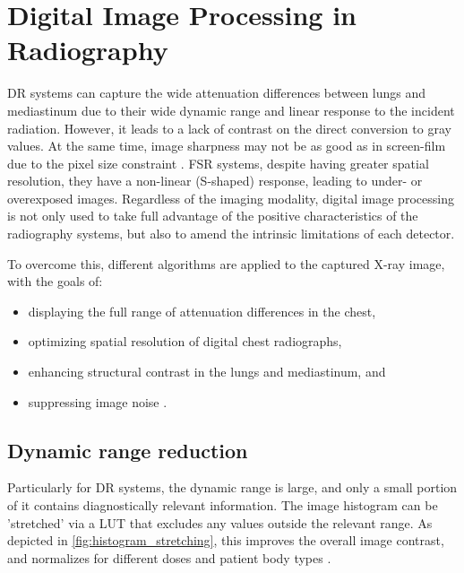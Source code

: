 \documentclass[nomenclature, english, bibtex]{kththesis}
\numberwithin{listing}{chapter}
\begin{document}
\section{Digital Image Processing in Radiography}
\label{sec:DigitalImageProcessing}


\acrfull{DR} systems can capture the wide attenuation differences between lungs and mediastinum due to
their wide dynamic range and linear response to the incident radiation. However, it leads to a lack of contrast on
the direct conversion to gray values. At the same time, image sharpness may not be as good as in screen-film
due to the pixel size constraint \cite[p.~148]{Prokop2003}. \acrfull{FSR} systems, despite having greater spatial
resolution, they have a non-linear (S-shaped) response, leading to under- or overexposed images\cite[p.~551]{vuylstekeMultiscaleImageContrast1994}.
Regardless of the imaging modality, digital image processing is not only used to take full advantage of the positive
characteristics of the radiography systems, but also to amend the intrinsic limitations of each detector.

To overcome this, different algorithms are applied to the captured X-ray image, with the goals of:

\begin{itemize}
    \item displaying the full range of attenuation differences in the chest,
    \item optimizing spatial resolution of digital chest radiographs,
    \item enhancing structural contrast in the lungs and mediastinum, and
    \item suppressing image noise \cite[p.~149]{Prokop2003}.
\end{itemize}


\subsection{Dynamic range reduction}

Particularly for \acrshort{DR} systems, the dynamic range is large, and only a small portion of it contains diagnostically
relevant information. The image histogram can be 'stretched' via a \acrfull{LUT} that excludes
any values outside the relevant range. As depicted in \autoref{fig:histogram_stretching}, this improves the overall
image contrast, and normalizes for different doses and patient body types \cite[p.~151]{Prokop2003}.
\end{document}
